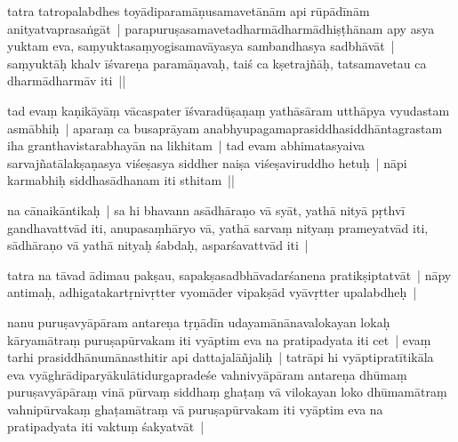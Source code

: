 \documentclass[article,12pt,a4paper]{memoir}%
\newcounter{parCount}
\begin{document}
tatra tatropalabdhes toyādiparamāṇusamavetānām api rūpādīnām anityatvaprasaṅgāt | parapuruṣasamavetadharmādharmādhiṣṭhānam apy asya yuktam eva, saṃyuktasaṃyogisamavāyasya sambandhasya sadbhāvāt | saṃyuktāḥ khalv īśvareṇa paramāṇavaḥ, taiś ca kṣetrajñāḥ, tatsamavetau ca dharmādharmāv iti ||
	{}
	\pend%
      

	  
	  \pstart \leavevmode%
	\label{thakur75-36.17}tad evaṃ kaṇikāyāṃ vācaspater īśvaradūṣaṇaṃ yathāsāram utthāpya vyudastam asmābhiḥ | aparaṃ ca busaprāyam anabhyupagamaprasiddhasiddhāntagrastam iha granthavistarabhayān na likhitam | tad evam abhimatasyaiva sarvajñatālakṣaṇasya viśeṣasya siddher naiṣa viśeṣaviruddho hetuḥ | nāpi karmabhiḥ siddhasādhanam iti sthitam || 
	{}
	\pend%
      

	  
	  \pstart \leavevmode%
	\label{thakur75-36.21} na cānaikāntikaḥ | sa hi bhavann asādhāraṇo vā syāt, yathā nityā pṛthvī gandhavattvād iti, anupasaṃhāryo vā, yathā sarvaṃ nityaṃ prameyatvād iti, sādhāraṇo vā yathā nityaḥ śabdaḥ, asparśavattvād iti |
	{}
	\pend%
      

	  
	  \pstart \leavevmode%
	\label{thakur75-36.24}tatra na tāvad ādimau pakṣau, sapakṣasadbhāvadarśanena pratikṣiptatvāt | nāpy antimaḥ, adhigatakartṛnivṛtter vyomāder vipakṣād vyāvṛtter upalabdheḥ | 
	{}
	\pend%
      

	  
	  \pstart \leavevmode%
	\label{thakur75-36.26}nanu puruṣavyāpāram antareṇa tṛṇādīn udayamānānavalokayan lokaḥ kāryamātraṃ puruṣapūrvakam iti vyāptim eva na pratipadyata iti cet | evaṃ tarhi prasiddhānumānasthitir api dattajalāñjaliḥ | tatrāpi hi vyāptipratītikāla eva vyāghrā\leavevmode{}\label{RNAms_21a}diparyākulātidurgapradeśe vahnivyāpāram antareṇa dhūmaṃ puruṣavyāpāraṃ vinā pūrvaṃ siddhaṃ ghaṭaṃ vā vilokayan loko dhūmamātraṃ vahnipūrvakaṃ ghaṭamātraṃ vā puruṣapūrvakam iti vyāptim eva na pratipadyata iti vaktuṃ śakyatvāt |
	{}
	\pend%
      
\end{document}
